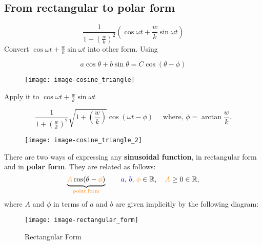 \subsection{From rectangular to polar form}
\begin{equation*}
  \displaystyle \frac{1}{1 + (\frac{w}{k})^2}
  \left( \cos \omega t + \frac{w}{k} \sin \omega t \right)
\end{equation*}
Convert $\cos \omega t + \frac{w}{k} \sin \omega t$ into other form.
Using\\
\begin{SCfigure}[][h] %
  \begin{minipage}{.5\textwidth}
    \begin{equation*}
        a \cos \theta + b \sin \theta = C \cos \left( \theta - \phi \right)
    \end{equation*}
  \end{minipage}%
  \begin{minipage}{0.5\textwidth}
    \centering
    \texttt{[image: image-cosine\_triangle]}
  \end{minipage}
\end{SCfigure}

Apply it to $\cos \omega t + \frac{w}{k} \sin \omega t$\\
\begin{SCfigure}[][h] 
  \begin{minipage}{.6\textwidth}
    \begin{equation*}
      \displaystyle \frac{1}{1 + (\frac{w}{k})^2} \sqrt{1 + (\frac{w}{k})}
       \cos (\omega t - \phi) \quad \text{ where, } \phi = \arctan \frac{w}{k}. 
    \end{equation*}
  \end{minipage}%
  \begin{minipage}{0.4\textwidth}
    \centering
    \texttt{[image: image-cosine\_triangle\_2]}
  \end{minipage}
\end{SCfigure}

There are two ways of expressing any \textbf{\color{blue} sinusoidal function},
in rectangular form and in \textbf{\color{orange}polar form}. They are related as follows:
\begin{equation*}
  \displaystyle  \underbrace{{\color{orange}{A}}
    \cos (\theta -{\color{orange}{\phi }} )}_{{\color{orange}{\text {polar form}}} }
  \qquad {\color{blue}{a}} ,\,
  {\color{blue}{b}} ,\,  {\color{orange}{\phi }}  \in \mathbb {R}, \  \  \
  {\color{orange}{A}} \geq 0 \in \mathbb {R},
\end{equation*}
where $A$ and $\phi$ in terms of $a$ and $b$ are given implicitly by the following diagram:
\begin{figure}[ht!]
  \centering
  \texttt{[image: image-rectangular\_form]}
  \caption{Rectangular Form}
\end{figure}
\clearpage

